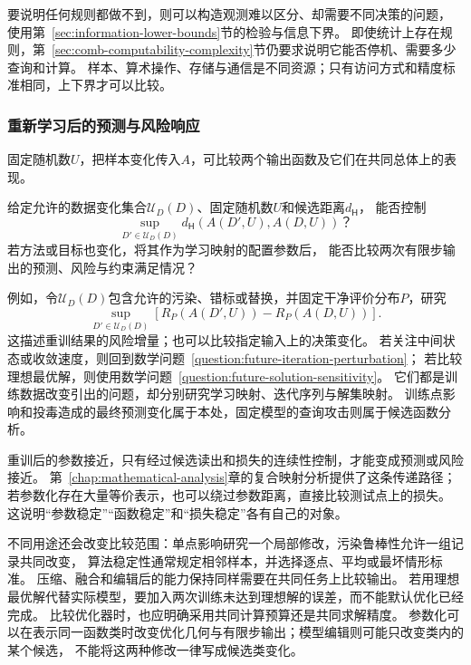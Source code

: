 要说明任何规则都做不到，则可以构造观测难以区分、却需要不同决策的问题，
使用第~\ref{sec:information-lower-bounds}节的检验与信息下界。
即使统计上存在规则，第~\ref{sec:comb-computability-complexity}节仍要求说明它能否停机、需要多少查询和计算。
样本、算术操作、存储与通信是不同资源；只有访问方式和精度标准相同，上下界才可以比较。

\subsubsection{重新学习后的预测与风险响应}
\label{sec:future-analysis-perturbation-map}

固定随机数$U$，把样本变化传入$A$，可比较两个输出函数及它们在共同总体上的表现。

\begin{mathproblem}[学习映射对样本与配置的响应]
  \label{question:future-perturbation-map}
  给定允许的数据变化集合$\mathcal U_D(D)$、固定随机数$U$和候选距离$d_{\mathsf H}$，
  能否控制
  \[
    \sup_{D'\in\mathcal U_D(D)}
      d_{\mathsf H}(A(D',U),A(D,U))\text{？}
  \]
  若方法或目标也变化，将其作为学习映射的配置参数后，
  能否比较两次有限步输出的预测、风险与约束满足情况？
\end{mathproblem}

例如，令$\mathcal U_D(D)$包含允许的污染、错标或替换，并固定干净评价分布$P$，研究
\begin{equation}
  \sup_{D'\in\mathcal U_D(D)}
  \left[R_P(A(D',U))-R_P(A(D,U))\right].
  \label{eq:future-training-robustness-question}
\end{equation}
这描述重训结果的风险增量；也可以比较指定输入上的决策变化。
若关注中间状态或收敛速度，则回到数学问题~\ref{question:future-iteration-perturbation}；
若比较理想最优解，则使用数学问题~\ref{question:future-solution-sensitivity}。
它们都是训练数据改变引出的问题，却分别研究学习映射、迭代序列与解集映射。
训练点影响和投毒造成的最终预测变化属于本处，固定模型的查询攻击则属于候选函数分析。

重训后的参数接近，只有经过候选读出和损失的连续性控制，才能变成预测或风险接近。
第~\ref{chap:mathematical-analysis}章的复合映射分析提供了这条传递路径；
若参数化存在大量等价表示，也可以绕过参数距离，直接比较测试点上的损失。
这说明“参数稳定”“函数稳定”和“损失稳定”各有自己的对象。

不同用途还会改变比较范围：单点影响研究一个局部修改，污染鲁棒性允许一组记录共同改变，
算法稳定性通常规定相邻样本，并选择逐点、平均或最坏情形标准。
压缩、融合和编辑后的能力保持同样需要在共同任务上比较输出。
若用理想最优解代替实际模型，要加入两次训练未达到理想解的误差，而不能默认优化已经完成。
比较优化器时，也应明确采用共同计算预算还是共同求解精度。
参数化可以在表示同一函数类时改变优化几何与有限步输出；模型编辑则可能只改变类内的某个候选，
不能将这两种修改一律写成候选类变化。

